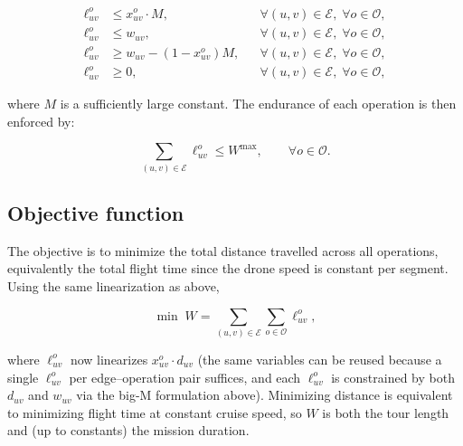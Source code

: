 \documentclass[12pt]{elsarticle}
\begin{document}
\begin{align}
    \ell_{uv}^o &\le x_{uv}^o\cdot M,
                && \forall (u,v)\in\mathcal E,\;\forall o\in\mathcal O,
                \label{eq:end_lin1}\tag{End-C$_1$}\\
    \ell_{uv}^o &\le w_{uv},
                && \forall (u,v)\in\mathcal E,\;\forall o\in\mathcal O,
                \label{eq:end_lin2}\tag{End-C$_2$}\\
    \ell_{uv}^o &\ge w_{uv} - (1-x_{uv}^o)M,
                && \forall (u,v)\in\mathcal E,\;\forall o\in\mathcal O,
                \label{eq:end_lin3}\tag{End-C$_3$}\\
    \ell_{uv}^o &\ge 0,
                && \forall (u,v)\in\mathcal E,\;\forall o\in\mathcal O,
                \label{eq:end_lin4}\tag{End-C$_4$}
\end{align}

\noindent where $M$ is a sufficiently large constant. The endurance of each operation is then enforced by:

\begin{equation}
    \sum_{(u,v)\in\mathcal E} \ell_{uv}^o \le W^{\max},
    \qquad \forall o\in\mathcal O.
    \label{eq:endurance}\tag{End-C$_5$}
\end{equation}

\subsection{Objective function}

The objective is to minimize the total distance travelled across all operations, equivalently the total flight time since the drone speed is constant per segment. Using the same linearization as above,

\begin{equation}
    \min\; W = \sum_{(u,v)\in\mathcal E}\sum_{o\in\mathcal O} \ell_{uv}^o,
    \label{eq:objective}\tag{Objective}
\end{equation}

\noindent where $\ell_{uv}^o$ now linearizes $x_{uv}^o\cdot d_{uv}$ (the same variables can be reused because a single $\ell_{uv}^o$ per edge--operation pair suffices, and each $\ell_{uv}^o$ is constrained by both $d_{uv}$ and $w_{uv}$ via the big-M formulation above). Minimizing distance is equivalent to minimizing flight time at constant cruise speed, so $W$ is both the tour length and (up to constants) the mission duration.
\end{document}
